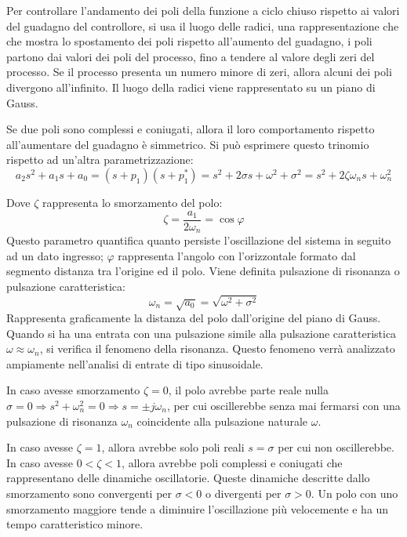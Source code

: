 \documentclass{article}
\numberwithin{equation}{subsection}
\begin{document}
Per controllare l'andamento dei poli della funzione a ciclo chiuso rispetto ai valori del guadagno del controllore, si usa il luogo delle radici, una 
rappresentazione che che mostra lo spostamento dei poli rispetto all'aumento del guadagno, i poli partono dai valori dei poli del processo, fino a tendere 
al valore degli zeri del processo. Se il processo presenta un numero minore di zeri, allora alcuni dei poli divergono all'infinito. 
Il luogo della radici viene rappresentato su un piano di Gauss. 


Se due poli sono complessi e coniugati, allora il loro comportamento rispetto all'aumentare del guadagno è simmetrico. Si può esprimere questo trinomio rispetto ad 
un'altra parametrizzazione:
\begin{equation*}
    a_2s^2+a_1s+a_0=(s+p_1)(s+p_1^*)=s^2+2\sigma s+\omega^2+\sigma^2=s^2+2\zeta\omega_ns+\omega_n^2
\end{equation*}


Dove $\zeta$ rappresenta lo smorzamento del polo:
\begin{equation*}
    \zeta=\displaystyle\frac{a_1}{2\omega_n}=\cos\varphi
\end{equation*}
Questo parametro quantifica quanto persiste l'oscillazione del sistema in seguito ad un dato ingresso; $\varphi$ rappresenta l'angolo con l'orizzontale formato dal segmento 
distanza tra l'origine ed il polo.
Viene definita pulsazione di risonanza o pulsazione caratteristica:
\begin{equation*}
    \omega_n=\displaystyle\sqrt{a_0}=\sqrt{\omega^2+\sigma^2}
\end{equation*}
Rappresenta graficamente la distanza del polo dall'origine 
del piano di Gauss. Quando si ha una entrata con una pulsazione simile alla pulsazione caratteristica $\omega\approx\omega_n$, si verifica il fenomeno della risonanza. Questo 
fenomeno verrà analizzato ampiamente nell'analisi di entrate di tipo sinusoidale. 


In caso avesse smorzamento $\zeta=0$, il polo avrebbe parte reale nulla $\sigma=0\Rightarrow s^2+\omega_n^2=0\Rightarrow s=\pm j\omega_n$, per cui 
oscillerebbe senza mai fermarsi con una pulsazione di risonanza $\omega_n$ coincidente alla pulsazione naturale $\omega$.

In caso avesse $\zeta=1$, allora avrebbe solo poli reali $s=\sigma$ per cui non oscillerebbe. 
In caso avesse $0<\zeta<1$, allora avrebbe poli complessi e coniugati che rappresentano delle dinamiche oscillatorie. 
Queste dinamiche descritte dallo smorzamento sono convergenti per $\sigma<0$ o divergenti per $\sigma>0$. 
Un polo con uno smorzamento maggiore tende a diminuire l'oscillazione più velocemente e ha un tempo caratteristico minore. 
\end{document}
